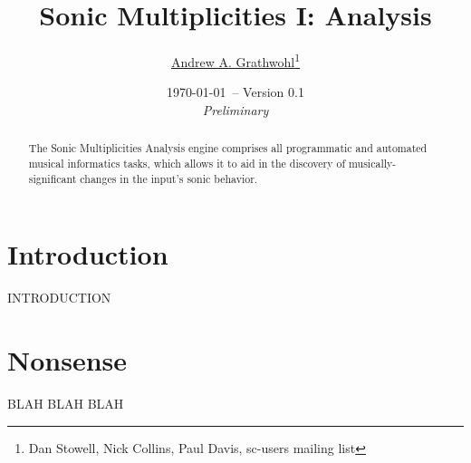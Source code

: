 \documentclass[12pt,twoside]{article}
\begin{document}



\begin{spacing}{0.9}
\begin{titlepage}

\title{Sonic Multiplicities I: Analysis}

\author{\large \href{http://about.me/agrathwohl}{Andrew A. Grathwohl}\thanks{Dan Stowell, Nick Collins, Paul Davis, sc-users mailing list}\\ {}
   }

\date{\small \today \ -- Version 0.1\\ {\it Preliminary}}
\maketitle
\thispagestyle{empty}

\vspace{-0.3in}

\begin{abstract}
   The Sonic Multiplicities Analysis engine comprises all programmatic and automated musical informatics tasks, which allows it to aid in the discovery of musically-significant changes in the input's sonic behavior.
\end{abstract}

\end{titlepage}
\end{spacing}


\section{Introduction}

INTRODUCTION

\section{Nonsense}

BLAH BLAH BLAH

{\small
%
}
\end{document}
